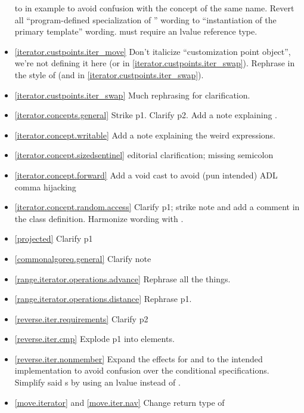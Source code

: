 \begin{itemize}
  to  in example to avoid confusion with the concept of the same name.
  Revert all ``program-defined specialization of '' wording
  to ``instantiation of the primary template'' wording.
   must require an lvalue reference
  type.
\item \ref{iterator.custpoints.iter_move} Don't italicize ``customization point
  object'', we're not defining it here
  (or in \ref{iterator.custpoints.iter_swap}). Rephrase in the style of
   (and in
  \ref{iterator.custpoints.iter_swap}).
\item \ref{iterator.custpoints.iter_swap} Much rephrasing for clarification.
\item \ref{iterator.concepts.general} Strike p1. Clarify p2.
  Add a note explaining .
\item \ref{iterator.concept.writable} Add a note explaining the weird
   expressions.
\item \ref{iterator.concept.sizedsentinel} editorial clarification;
  missing semicolon
\item \ref{iterator.concept.forward} Add a void cast to avoid (pun intended) ADL
  comma hijacking
\item \ref{iterator.concept.random.access} Clarify p1; strike note and add a
   comment in the class definition. Harmonize wording with
  .
\item \ref{projected} Clarify p1
\item \ref{commonalgoreq.general} Clarify note
\item \ref{range.iterator.operations.advance} Rephrase all the things.
\item \ref{range.iterator.operations.distance} Rephrase p1.
\item \ref{reverse.iter.requirements} Clarify p2
\item \ref{reverse.iter.cmp} Explode p1 into \constraints elements.
\item \ref{reverse.iter.nonmember} Expand the effects for  and
   to the intended implementation to avoid confusion over the
  conditional  specifications. Simplify said s
  by using an lvalue  instead of .
\item \ref{move.iterator} and \ref{move.iter.nav} Change return type of

\end{itemize}

